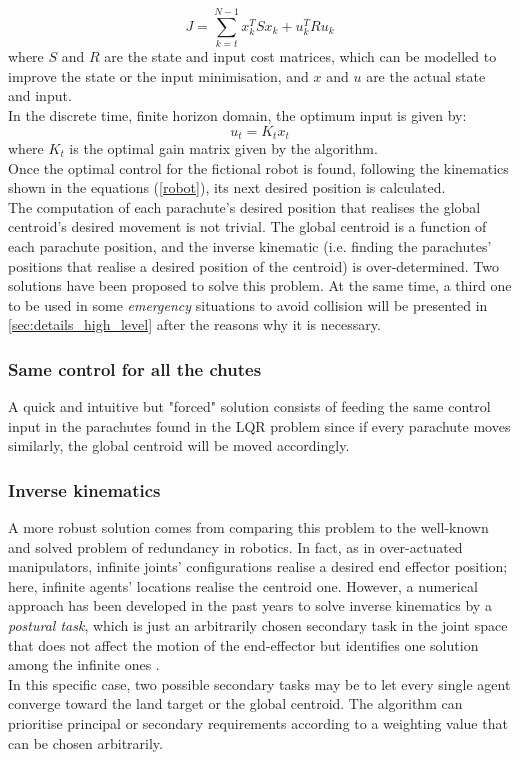 \begin{equation}
    J = \sum_{k=t}^{N-1} x_k^TSx_k + u_k^TRu_k
\end{equation}
where $S$ and $R$ are the state and input cost matrices, which can be modelled to improve the state or the input minimisation, and $x$ and $u$ are the actual state and input.\\
In the discrete time, finite horizon domain, the optimum input is given by:
\begin{equation}
    u_t=K_tx_t 
\end{equation}
where $K_t$ is the optimal gain matrix given by the algorithm.\\
Once the optimal control for the fictional robot is found, following the kinematics shown in the equations (\ref{robot}), its next desired position is calculated.\\
The computation of each parachute's desired position that realises the global centroid's desired movement is not trivial. The global centroid is a function of each parachute position, and the inverse kinematic (i.e. finding the parachutes' positions that realise a desired position of the centroid) is over-determined. Two solutions have been proposed to solve this problem. At the same time, a third one to be used in some \textit{emergency} situations to avoid collision will be presented in \autoref{sec:details_high_level} after the reasons why it is necessary.
\subsubsection{Same control for all the chutes}
 A quick and intuitive but "forced" solution consists of feeding the same control input in the parachutes found in the LQR problem since if every parachute moves similarly, the global centroid will be moved accordingly.
 \subsubsection{Inverse kinematics}
  A more robust solution comes from comparing this problem to the well-known and solved problem of redundancy in robotics. In fact, as in over-actuated manipulators, infinite joints' configurations realise a desired end effector position; here, infinite agents' locations realise the centroid one. However, a numerical approach has been developed in the past years to solve inverse kinematics by a \textit{postural task}, which is just an arbitrarily chosen secondary task in the joint space that does not affect the motion of the end-effector  but identifies one solution among the infinite ones \cite{b5} \cite{b6}.\\
In this specific case, two possible secondary tasks may be to let every single agent converge toward the land target or the global centroid. The algorithm can prioritise principal or secondary requirements according to a weighting value that can be chosen arbitrarily.

